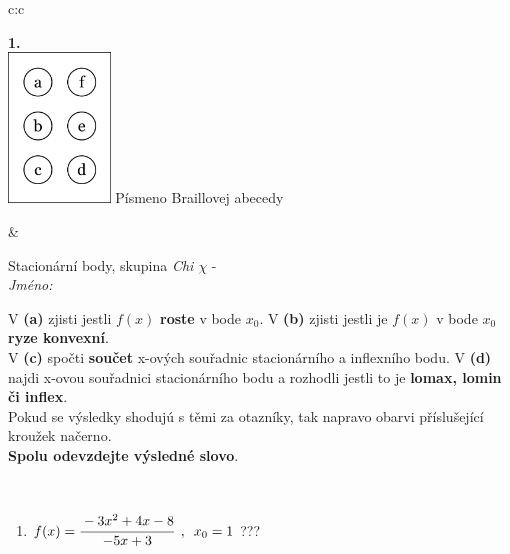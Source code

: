 \documentclass[10pt]{report}
\begin{document}
\begin{tabular}{c:c}
\begin{minipage}[c][104.5mm][t]{0.5\linewidth}
\begin{center}
\begin{minipage}{0.79\linewidth}
\end{minipage}
\begin{minipage}{0.20\linewidth}
\begin{center}
{\Huge\bfseries 1.} \\[2mm]
\includegraphics[height=40mm]{../images/braille.png}
{\small Písmeno Braillovej abecedy}
\end{center}
\end{minipage}
\end{center}
\end{minipage}
&
\begin{minipage}[c][104.5mm][t]{0.5\linewidth}
\begin{center}
\vspace{7mm}
{\huge Stacionární body, skupina \textit{Chi $\chi$} -}\\[5mm]
\textit{Jméno:}\phantom{xxxxxxxxxxxxxxxxxxxxxxxxxxxxxxxxxxxxxxxxxxxxxxxxxxxxxxxxxxxxxxxxx}\\[5mm]
\begin{minipage}{0.95\linewidth}
\begin{center}
{\small V \textbf{(a)} zjisti jestli $f(x)$ \textbf{roste} v bode $x_0$. V \textbf{(b)} zjisti jestli je $f(x)$ v bode $x_0$ \textbf{ryze konvexní}.\\V \textbf{(c)} spočti \textbf{součet} x-ových souřadnic stacionárního a inflexního bodu. V \textbf{(d)} najdi x-ovou souřadnici stacionárního bodu a rozhodli jestli to je \textbf{lomax, lomin či inflex}.\\Pokud se výsledky shodujú s těmi za otazníky, tak napravo obarvi příslušející kroužek načerno.\\\textbf{Spolu odevzdejte výsledné slovo}}.
\end{center}
\end{minipage}
\\[1mm]
\begin{minipage}{0.79\linewidth}
\begin{center}
\begin{varwidth}{\linewidth}
\begin{enumerate}
\normalsize
\item $f(x)=\cfrac{-3x^2+4x-8}{-5x+3}\enspace , \enspace x_0=1$\quad \dotfill\; ???\;\dotfill \quad {}

\end{enumerate}
\end{varwidth}
\end{center}
\end{minipage}
\end{center}
\end{minipage}
\end{tabular}
\end{document}
